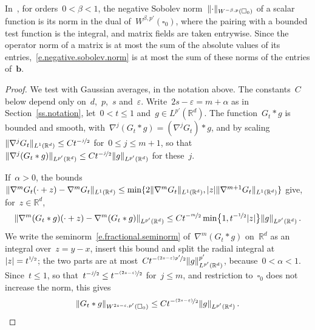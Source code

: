 \documentclass[11pt,letterpaper]{article}
\numberwithin{equation}{section}
\theoremstyle{definition}
\newcommand{\Rd}{\mathbb{R}^d}
\newcommand{\eps}{\varepsilon}
\newcommand{\nf}{\nicefrac}
\newcommand{\cu}{\square}
\DeclarePairedDelimiter{\norm}{\lVert}{\rVert}
\begin{document}
In~\cite{AADKM}, for orders~$0<\beta<1$, the negative Sobolev norm~$\norm{\cdot}_{W^{-\beta,p}(\cu_0)}$ of a scalar function is its norm in the dual of~$W^{\beta,p'}(\cu_0)$, where the pairing with a bounded test function is the integral, and matrix fields are taken entrywise. Since the operator norm of a matrix is at most the sum of the absolute values of its entries,~\eqref{e.negative.sobolev.norm} is at most the sum of these norms of the entries of~$\mathbf b$.

\begin{proof}
We test with Gaussian averages, in the notation above. The constants~$C$ below depend only on~$d$,~$p$,~$s$ and~$\eps$. Write~$2s-\eps=m+\alpha$ as in Section~\ref{ss.notation}, let~$0<t\leq1$ and~$g\in L^{p'}(\Rd)$. The function~$G_t*g$ is bounded and smooth, with~$\nabla^j(G_t*g)=(\nabla^jG_t)*g$, and by scaling~$\norm{\nabla^jG_t}_{L^1(\Rd)}\leq Ct^{-\nf j2}$ for~$0\leq j\leq m+1$, so that~$\norm{\nabla^j(G_t*g)}_{L^{p'}(\Rd)}\leq Ct^{-\nf j2}\norm{g}_{L^{p'}(\Rd)}$ for these~$j$.

\smallskip

If~$\alpha>0$, the bounds~$\norm{\nabla^mG_t(\cdot+z)-\nabla^mG_t}_{L^1(\Rd)}\leq\min\{2\norm{\nabla^mG_t}_{L^1(\Rd)},|z|\norm{\nabla^{m+1}G_t}_{L^1(\Rd)}\}$ give, for~$z\in\Rd$,
\begin{equation*}
	\norm{\nabla^m(G_t*g)(\cdot+z)-\nabla^m(G_t*g)}_{L^{p'}(\Rd)}\leq Ct^{-\nf m2}\min\bigl\{1,t^{-\nf12}|z|\bigr\}\norm{g}_{L^{p'}(\Rd)}\,.
\end{equation*}
We write the seminorm~\eqref{e.fractional.seminorm} of~$\nabla^m(G_t*g)$ on~$\Rd$ as an integral over~$z=y-x$, insert this bound and split the radial integral at~$|z|=t^{\nf12}$; the two parts are at most~$Ct^{-\nf{(2s-\eps)p'}2}\norm{g}_{L^{p'}(\Rd)}^{p'}$, because~$0<\alpha<1$. Since~$t\leq1$, so that~$t^{-\nf j2}\leq t^{-\nf{(2s-\eps)}2}$ for~$j\leq m$, and restriction to~$\cu_0$ does not increase the norm, this gives
\begin{equation*}
	\norm{G_t*g}_{W^{2s-\eps,p'}(\cu_0)}\leq Ct^{-\nf{(2s-\eps)}2}\norm{g}_{L^{p'}(\Rd)}\,.
\end{equation*}

\smallskip


\end{proof}
\end{document}
